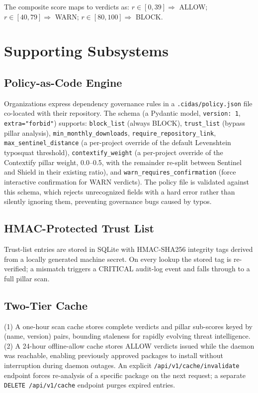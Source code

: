 \documentclass[journal]{IEEEtran}
\begin{document}
The composite score maps to verdicts as: $r \in [0,39] \Rightarrow$ ALLOW; $r \in [40,79] \Rightarrow$ WARN;
$r \in [80,100] \Rightarrow$ BLOCK.

\section{Supporting Subsystems}

\subsection{Policy-as-Code Engine}
Organizations express dependency governance rules in a \texttt{.cidas/policy.json} file co-located with
their repository. The schema (a Pydantic model, \texttt{version: 1}, \texttt{extra="forbid"}) supports:
\texttt{block\_list} (always BLOCK), \texttt{trust\_list} (bypass pillar analysis),
\texttt{min\_monthly\_downloads}, \texttt{require\_repository\_link}, \texttt{max\_sentinel\_distance} (a
per-project override of the default Levenshtein typosquat threshold), \texttt{contextify\_weight} (a
per-project override of the Contextify pillar weight, 0.0--0.5, with the remainder re-split between Sentinel
and Shield in their existing ratio), and \texttt{warn\_requires\_confirmation} (force interactive
confirmation for WARN verdicts). The policy file is validated against this schema, which rejects
unrecognized fields with a hard error rather than silently ignoring them, preventing governance bugs caused
by typos.

\subsection{HMAC-Protected Trust List}
Trust-list entries are stored in SQLite with HMAC-SHA256 integrity tags derived from a locally generated
machine secret. On every lookup the stored tag is re-verified; a mismatch triggers a CRITICAL audit-log event
and falls through to a full pillar scan.

\subsection{Two-Tier Cache}
(1) A one-hour scan cache stores complete verdicts and pillar sub-scores keyed by (name, version) pairs,
bounding staleness for rapidly evolving threat intelligence. (2) A 24-hour offline-allow cache stores ALLOW
verdicts issued while the daemon was reachable, enabling previously approved packages to install without
interruption during daemon outages. An explicit \texttt{/api/v1/cache/invalidate} endpoint forces re-analysis
of a specific package on the next request; a separate \texttt{DELETE /api/v1/cache} endpoint purges expired
entries.
\end{document}
